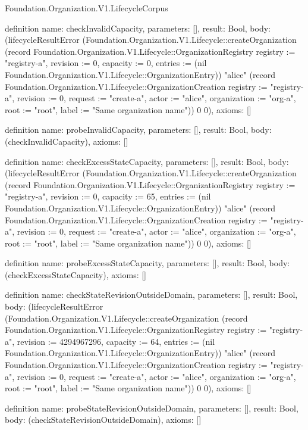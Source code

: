 \begin{lexlean}{Foundation.Organization.V1.LifecycleCorpus}
\begin{semanticmodule}
definition{
  name: checkInvalidCapacity,
  parameters: [],
  result: Bool,
  body: (lifecycleResultError (Foundation.Organization.V1.Lifecycle::createOrganization (record Foundation.Organization.V1.Lifecycle::OrganizationRegistry {registry := "registry-a", revision := 0, capacity := 0, entries := (nil Foundation.Organization.V1.Lifecycle::OrganizationEntry)}) "alice" (record Foundation.Organization.V1.Lifecycle::OrganizationCreation {registry := "registry-a", revision := 0, request := "create-a", actor := "alice", organization := "org-a", root := "root", label := "Same organization name"})) 0 0),
  axioms: []
}

definition{
  name: probeInvalidCapacity,
  parameters: [],
  result: Bool,
  body: (checkInvalidCapacity),
  axioms: []
}

definition{
  name: checkExcessStateCapacity,
  parameters: [],
  result: Bool,
  body: (lifecycleResultError (Foundation.Organization.V1.Lifecycle::createOrganization (record Foundation.Organization.V1.Lifecycle::OrganizationRegistry {registry := "registry-a", revision := 0, capacity := 65, entries := (nil Foundation.Organization.V1.Lifecycle::OrganizationEntry)}) "alice" (record Foundation.Organization.V1.Lifecycle::OrganizationCreation {registry := "registry-a", revision := 0, request := "create-a", actor := "alice", organization := "org-a", root := "root", label := "Same organization name"})) 0 0),
  axioms: []
}

definition{
  name: probeExcessStateCapacity,
  parameters: [],
  result: Bool,
  body: (checkExcessStateCapacity),
  axioms: []
}

definition{
  name: checkStateRevisionOutsideDomain,
  parameters: [],
  result: Bool,
  body: (lifecycleResultError (Foundation.Organization.V1.Lifecycle::createOrganization (record Foundation.Organization.V1.Lifecycle::OrganizationRegistry {registry := "registry-a", revision := 4294967296, capacity := 64, entries := (nil Foundation.Organization.V1.Lifecycle::OrganizationEntry)}) "alice" (record Foundation.Organization.V1.Lifecycle::OrganizationCreation {registry := "registry-a", revision := 0, request := "create-a", actor := "alice", organization := "org-a", root := "root", label := "Same organization name"})) 0 0),
  axioms: []
}

definition{
  name: probeStateRevisionOutsideDomain,
  parameters: [],
  result: Bool,
  body: (checkStateRevisionOutsideDomain),
  axioms: []
}


\end{semanticmodule}
\end{lexlean}

